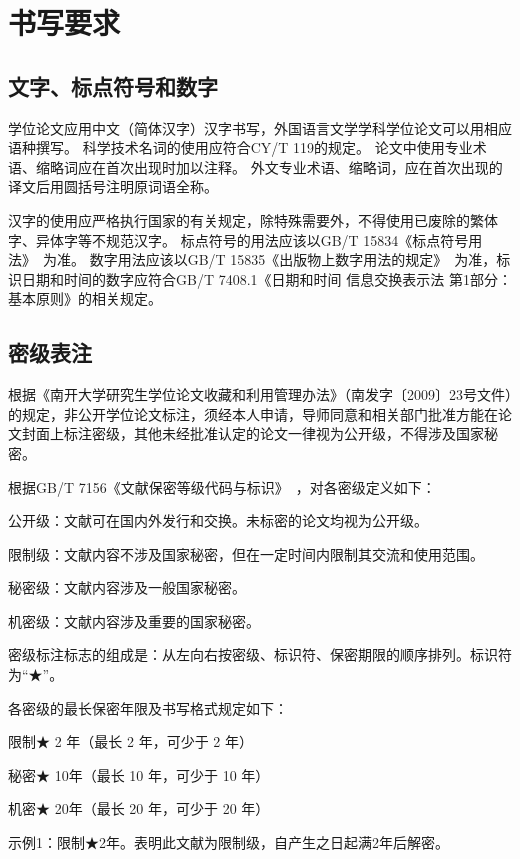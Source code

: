 \chapter{书写要求}
\label{chap:writing-requirements}

\section{文字、标点符号和数字}

学位论文应用中文（简体汉字）汉字书写，外国语言文学学科学位论文可以用相应语种撰写。
科学技术名词的使用应符合CY/T 119的规定。
论文中使用专业术语、缩略词应在首次出现时加以注释。
外文专业术语、缩略词，应在首次出现的译文后用圆括号注明原词语全称。

汉字的使用应严格执行国家的有关规定，除特殊需要外，不得使用已废除的繁体字、异体字等不规范汉字。
标点符号的用法应该以GB/T 15834《标点符号用法》~\cite{SCSF00038090}为准。
数字用法应该以GB/T 15835《出版物上数字用法的规定》~\cite{SCSF00036561}为准，标识日期和时间的数字应符合GB/T 7408.1《日期和时间 信息交换表示法 第1部分：基本原则》的相关规定。

\section{密级表注}
\label{sec:writing-classification}

根据《南开大学研究生学位论文收藏和利用管理办法》（南发字〔2009〕23号文件）的规定，非公开学位论文标注，须经本人申请，导师同意和相关部门批准方能在论文封面上标注密级，其他未经批准认定的论文一律视为公开级，不得涉及国家秘密。

根据GB/T 7156《文献保密等级代码与标识》~\cite{SCSF00000734}，对各密级定义如下：

公开级：文献可在国内外发行和交换。未标密的论文均视为公开级。

限制级：文献内容不涉及国家秘密，但在一定时间内限制其交流和使用范围。

秘密级：文献内容涉及一般国家秘密。

机密级：文献内容涉及重要的国家秘密。

密级标注标志的组成是：从左向右按密级、标识符、保密期限的顺序排列。标识符为“★”。

各密级的最长保密年限及书写格式规定如下：

限制★ 2 年（最长 2 年，可少于 2 年）

秘密★ 10年（最长 10 年，可少于 10 年）

机密★ 20年（最长 20 年，可少于 20 年）

示例1：限制★2年。表明此文献为限制级，自产生之日起满2年后解密。

